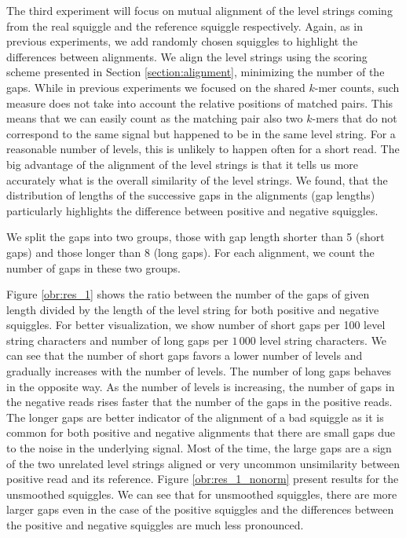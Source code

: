 The third experiment will focus on mutual alignment of the level strings coming from
the real squiggle and the reference squiggle respectively. Again, as in previous experiments,
we add randomly chosen squiggles to highlight the differences between alignments.
We align the level strings using the scoring scheme presented in Section \ref{section:alignment},
minimizing the number of the gaps. While in previous experiments we focused on
the shared $k$-mer counts, such measure
does not take into account the relative positions of matched pairs. This means
that we can easily count as the matching pair also two $k$-mers that
do not correspond to the same signal but happened to be in the same level string.
For a reasonable number of levels, this is unlikely to happen often for a short read.
The big advantage of the alignment of the level strings is that it tells us more accurately
what is the overall similarity of the level strings. We found, that the distribution
of lengths of the successive gaps in the alignments (gap lengths) particularly highlights
the difference between positive and negative squiggles.

We split the gaps into two groups, those with gap length shorter than 5 (short gaps) and those
longer than 8 (long gaps). For each alignment, we count the number of gaps in these two groups.

Figure \ref{obr:res_1} shows the ratio between the number of the gaps of given length divided
by the length of the level string for both positive and negative squiggles. For better visualization,
we show number of short gaps per 100 level string characters and number of long gaps
per $1\,000$ level string characters. We can see that the number of short gaps
favors a lower number of levels and gradually increases with the number
of levels. The number of long gaps behaves in the opposite way. As the number
of levels is increasing, the number of gaps in the negative reads rises faster that the number
of the gaps in the positive reads. The longer gaps are better indicator of the alignment of a bad squiggle as it is common for
both positive and negative alignments that there are small gaps due to the noise in the underlying signal.
Most of the time, the large gaps are a sign of the two
unrelated level strings aligned or very uncommon unsimilarity between positive read
and its reference. Figure \ref{obr:res_1_nonorm} present results for the unsmoothed
squiggles. We can see that for unsmoothed squiggles, there are more larger gaps even
in the case of the positive squiggles and the differences between the positive and negative
squiggles are much less pronounced.

